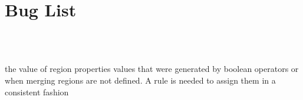 \chapter{Bug List }
\hypertarget{bug}{}\label{bug}

\begin{DoxyRefList}
\item[Class \doxylink{classcsmp_1_1_explicit_transport}{csmp\+::Explicit\+Transport\texorpdfstring{$<$}{<} dim \texorpdfstring{$>$}{>}} ]\hfill \\
\label{bug__bug000002}%
%
  
\item[Class \doxylink{classcsmp_1_1_region_interface}{csmp\+::Region\+Interface\texorpdfstring{$<$}{<} dim, REGION\+\_\+\+COMPLEX \texorpdfstring{$>$}{>}} ]\hfill \\
\label{bug__bug000001}%
%
the value of region properties values that were generated by boolean operators or when merging regions are not defined. A rule is needed to assign them in a consistent fashion 
\item[Class \doxylink{classcsmp_1_1_time_step_evaluator}{csmp\+::Time\+Step\+Evaluator\texorpdfstring{$<$}{<} dim, USER \texorpdfstring{$>$}{>}} ]\hfill \\
\label{bug__bug000003}%
%
 
\end{DoxyRefList}
